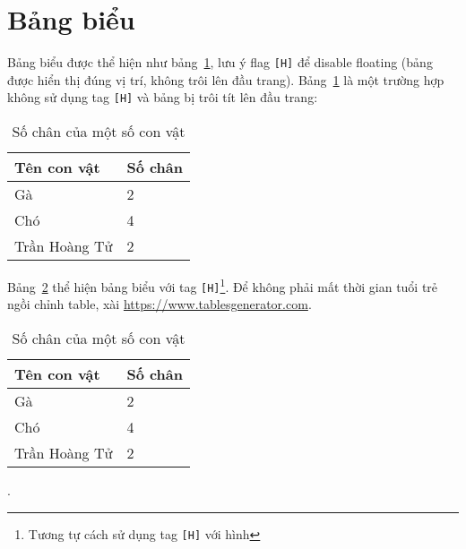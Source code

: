 \section{Bảng biểu}
Bảng biểu được thể hiện như bảng~\ref{tab:my_label}, lưu ý flag \texttt{[H]} để disable floating (bảng được hiển thị đúng vị trí, không trôi lên đầu trang). Bảng~\ref{tab:my_label} là một trường hợp không sử dụng tag \texttt{[H]} và bảng bị trôi tít lên đầu trang:
\begin{table}%
\centering
\begin{tabular}{|l|l|}
\hline
\textbf{Tên con vật} & \textbf{Số chân} \\ \hline
Gà & 2 \\ \hline
Chó & 4 \\ \hline
Trần Hoàng Tử & 2 \\ \hline
\end{tabular}
\caption{Số chân của một số con vật}
\label{tab:my_label}
\end{table}

Bảng~\ref{tab:my_label_with_H_tag} thể hiện bảng biểu với tag \texttt{[H]}\footnote{Tương tự cách sử dụng tag \texttt{[H]} với hình}. Để không phải mất thời gian tuổi trẻ ngồi chỉnh table, xài \href{https://www.tablesgenerator.com}{https://www.tablesgenerator.com}.

\begin{table}[H]
\centering
\begin{tabular}{|l|l|}
\hline
\textbf{Tên con vật} & \textbf{Số chân} \\ \hline
Gà & 2 \\ \hline
Chó & 4 \\ \hline
Trần Hoàng Tử & 2 \\ \hline
\end{tabular}
\caption{Số chân của một số con vật}
\label{tab:my_label_with_H_tag}
\end{table}.